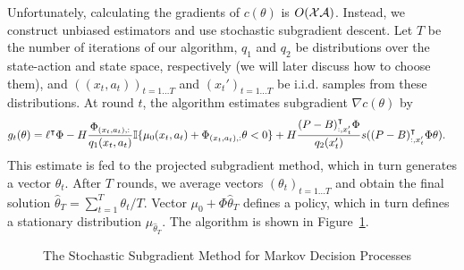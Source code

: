 \documentclass[11pt]{article}
\begin{document}
Unfortunately, calculating the gradients of $c(\theta)$ is $O({\cal X}{\cal A})$. Instead, we construct unbiased estimators and use stochastic subgradient descent.
Let $T$ be the number of iterations of our algorithm, $q_1$ and $q_2$ be distributions over the state-action and state space, respectively (we will later discuss how to choose them), and $((x_t,a_t))_{t=1\dots T}$ and $(x_t')_{t=1\dots T}$ be i.i.d. samples from these distributions. At round $t$, the algorithm estimates subgradient $\nabla c(\theta)$ by
\begin{align}
\label{eq:grad-est}
g_t(\theta) &= \ell^\intercal \Phi - H \frac{\Phi_{(x_t,a_t),:}}{q_1(x_t,a_t)} {\mathbb I}{\{\mu_0(x_t,a_t)+\Phi_{(x_t,a_t),:} \theta < 0\}} + H  \frac{(P-B)_{:,x_t'}^\intercal \Phi}{q_2(x_t')} s((P-B)_{:,x_t'}^\intercal \Phi \theta).
\end{align}
This estimate is fed to the projected subgradient method, which in turn generates a vector $\theta_t$. After $T$ rounds, we average vectors $(\theta_t)_{t=1\dots T}$ and obtain the final solution $\widehat \theta_T = \sum_{t=1}^T \theta_t/T$. Vector $\mu_0 + \Phi \widehat \theta_T$ defines a policy, which in turn defines a stationary distribution $\mu_{\widehat \theta_T}$. The algorithm is shown in Figure~\ref{alg:SGD}.


\begin{figure}
\begin{center}
\end{center}
\caption{The Stochastic Subgradient Method for Markov Decision Processes}
\label{alg:SGD}
\end{figure}
\end{document}
